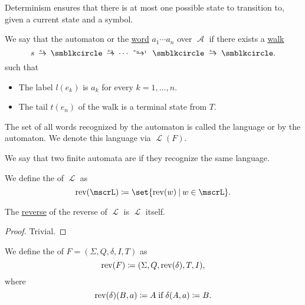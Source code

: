 \begin{definition}
\begin{thmenum}
    Determinism ensures that there is at most one possible state to transition to, given a current state and a symbol.

     We say that the automaton  or  the \hyperref[def:formal_language/word]{word} \( a_1 \cdots a_n \) over \( \mscrA \) if there exists a \hyperref[def:graph_walk/directed]{walk}
    \begin{equation*}
      s \reloset {e_1} \to \anon \reloset {e_2} \to \cdots \reloset {e_{n-1}} \to \anon \reloset {e_n} \to \anon.
    \end{equation*}
    such that
    \begin{itemize}
      \item The label \( l(e_k) \) is \( a_k \) for every \( k = 1, \ldots, n \).
      \item The tail \( t(e_n) \) of the walk is a terminal state from \( T \).
    \end{itemize}

     The set of all words recognized by the automaton is called the language  or  by the automaton. We denote this language via \( \mscrL(F) \).

     We say that two finite automata are  if they recognize the same language.
  \end{thmenum}
\end{definition}

\begin{definition}\label{def:reverse_language}
  We define the  of \( \mscrL \) as
  \begin{equation*}
    \op{rev}(\mscrL) \coloneqq \set{ \op{rev}(w) \given w \in \mscrL }.
  \end{equation*}
\end{definition}

\begin{proposition}\label{thm:reverse_language_involution}
  The \hyperref[def:reverse_language]{reverse} of the reverse of \( \mscrL \) is \( \mscrL \) itself.
\end{proposition}
\begin{proof}
  Trivial.
\end{proof}

\begin{definition}\label{def:reverse_finite_automaton}\mimprovised
  We define the  of \( F = (\Sigma, Q, \delta, I, T) \) as
  \begin{equation*}
    \operatorname{rev}(F) \coloneqq (\Sigma, Q, \operatorname{rev}(\delta), T, I),
  \end{equation*}
  where
  \begin{equation*}
    \op{rev}(\delta)(B, a) \coloneqq A \T{if} \delta(A, a) \coloneqq B.
  \end{equation*}
\end{definition}

